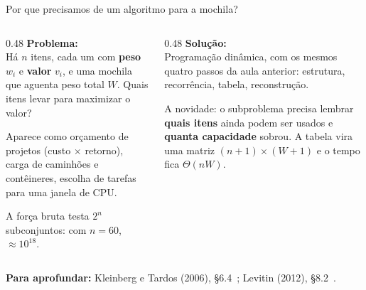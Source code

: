 \documentclass[aspectratio=169,xcolor=table]{beamer}
\newcommand{\fonte}[1]{%
  \vfill
  {\tiny\color{gray!55!black}\textbf{Para aprofundar:} #1\par}%
}
\begin{document}
\begin{frame}{Por que precisamos de um algoritmo para a mochila?}
  \begin{columns}[T]
    \begin{column}{0.48\textwidth}
      \textbf{Problema:}\\[2pt]
      \scriptsize Há $n$ itens, cada um com \textbf{peso} $w_i$ e \textbf{valor} $v_i$, e uma
      mochila que aguenta peso total $W$. Quais itens levar para maximizar o valor?
      \medskip

      Aparece como orçamento de projetos (custo $\times$ retorno), carga de caminhões e
      contêineres, escolha de tarefas para uma janela de CPU.
      \medskip

      A força bruta testa $2^n$ subconjuntos: com $n=60$, $\approx 10^{18}$.
    \end{column}
    \begin{column}{0.48\textwidth}
      \textbf{Solução:}\\[2pt]
      \scriptsize Programação dinâmica, com os mesmos quatro passos da aula anterior:
      estrutura, recorrência, tabela, reconstrução.
      \medskip

      A novidade: o subproblema precisa lembrar \textbf{quais itens} ainda podem ser
      usados e \textbf{quanta capacidade} sobrou. A tabela vira uma matriz
      $(n+1)\times(W+1)$ e o tempo fica $\Theta(nW)$.
    \end{column}
  \end{columns}
  \fonte{Kleinberg e Tardos (2006), \S 6.4~\cite{kleinberg2006algorithm};
    Levitin (2012), \S 8.2~\cite{levitin2012introduction}.}
\end{frame}
\end{document}

